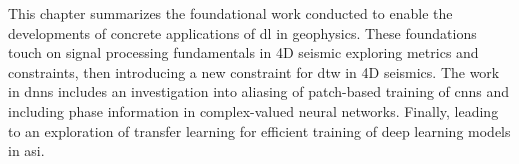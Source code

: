 This chapter summarizes the foundational work conducted to enable the developments of concrete applications of \acl{dl} in geophysics. These foundations touch on signal processing fundamentals in 4D seismic exploring metrics and constraints, then introducing a new constraint for \acl{dtw} in 4D seismics. The work in \aclp{dnn} includes an investigation into aliasing of patch-based training of \aclp{cnn} and including phase information in complex-valued neural networks. Finally, leading to an exploration of transfer learning for efficient training of deep learning models in \acl{asi}.